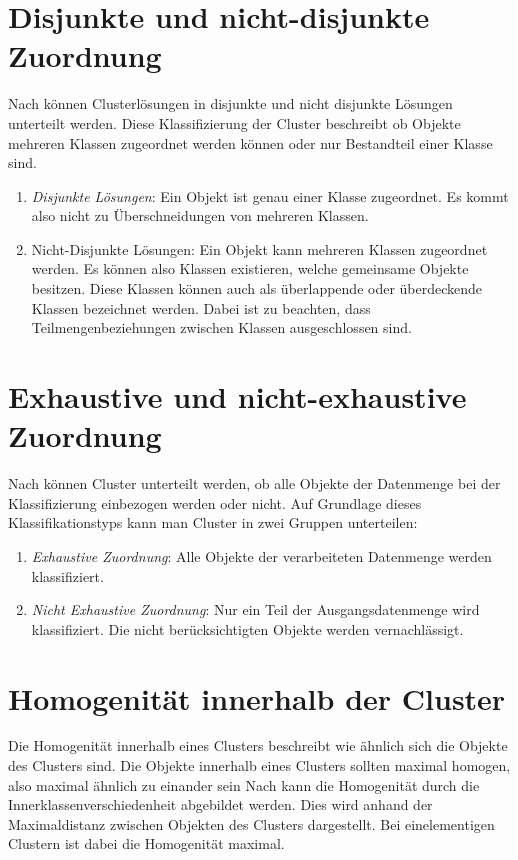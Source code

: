 \section{Disjunkte und nicht-disjunkte Zuordnung}
Nach \citet[S. 175]{Bankhofer.2008} können Clusterlösungen in disjunkte und nicht disjunkte Lösungen unterteilt werden. Diese Klassifizierung der Cluster beschreibt ob Objekte mehreren Klassen zugeordnet werden können oder nur Bestandteil einer Klasse sind.
\begin{enumerate}
    \item \textit{Disjunkte Lösungen}: Ein Objekt ist genau einer Klasse zugeordnet. Es kommt also nicht zu Überschneidungen von mehreren Klassen.
    \item {Nicht-Disjunkte Lösungen}: Ein Objekt kann mehreren Klassen zugeordnet werden. Es können also Klassen existieren, welche gemeinsame Objekte besitzen. Diese Klassen können auch als überlappende oder überdeckende Klassen bezeichnet werden. Dabei ist zu beachten, dass Teilmengenbeziehungen zwischen Klassen ausgeschlossen sind.
\end{enumerate}

\section{Exhaustive und nicht-exhaustive Zuordnung}
Nach \citet[S. 174]{Bankhofer.2008} können Cluster unterteilt werden, ob alle Objekte der Datenmenge bei der Klassifizierung einbezogen werden oder nicht. Auf Grundlage dieses Klassifikationstyps kann man Cluster in zwei Gruppen unterteilen:
\begin{enumerate}
    \item \textit{Exhaustive Zuordnung}: Alle Objekte der verarbeiteten Datenmenge werden klassifiziert.
    \item \textit{Nicht Exhaustive Zuordnung}: Nur ein Teil der Ausgangsdatenmenge wird klassifiziert. Die nicht berücksichtigten Objekte werden vernachlässigt.
\end{enumerate}

\section{Homogenität innerhalb der Cluster}
Die Homogenität innerhalb eines Clusters beschreibt wie ähnlich sich die Objekte des Clusters sind. Die Objekte innerhalb eines Clusters sollten maximal homogen, also maximal ähnlich zu einander sein \citep[Vgl.][S. 16]{Bacher.2010}
Nach \citet[S. 181]{Bankhofer.2008} kann die Homogenität durch die Innerklassenverschiedenheit abgebildet werden. Dies wird anhand der Maximaldistanz zwischen Objekten des Clusters dargestellt. Bei einelementigen Clustern ist dabei die Homogenität maximal.

